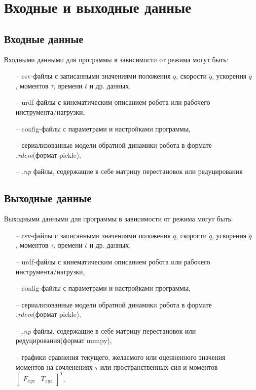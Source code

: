 \newpage
\section{Входные и выходные данные}

\subsection{Входные данные}
Входными данными для программы в зависимости от режима могут быть:
\begin{enumerate}
    \item [--] csv-файлы с записанными значениями положения $q$, скорости $\dot{q}$, ускорения $\ddot{q}$, моментов $\tau$, времени $t$ и др. данных,
	\item [--] urdf-файлы с кинематическим описанием робота или рабочего инструмента/нагрузки,
	\item [--] config-файлы с параметрами и настройками программы,
    \item [--] сериализованные модели обратной динамики робота в формате \textit{.rdcm}(формат pickle),
    \item [--] \textit{.np} файлы, содержащие в себе матрицу перестановок или редуцирования
\end{enumerate}

\subsection{Выходные данные}
Выходными данными для программы в зависимости от режима могут быть:
\begin{enumerate}
    \item [--] csv-файлы с записанными значениями положения $q$, скорости $\dot{q}$, ускорения $\ddot{q}$, моментов $\tau$, времени $t$ и др. данных,
	\item [--] urdf-файлы с кинематическим описанием робота или рабочего инструмента/нагрузки,
	\item [--] config-файлы с параметрами и настройками программы,
    \item [--] сериализованные модели обратной динамики робота в формате \textit{.rdcm}(формат pickle),
    \item [--] \textit{.np} файлы, содержащие в себе матрицу перестановок или редуцирования(формат numpy),
    \item [--] графики сравнения текущего, желаемого или оценненного значения моментов на сочленениях $\tau$ или пространственных сил и моментов $\begin{bmatrix} F_{xyz} & T_{xyz}\end{bmatrix}^T$.
\end{enumerate}